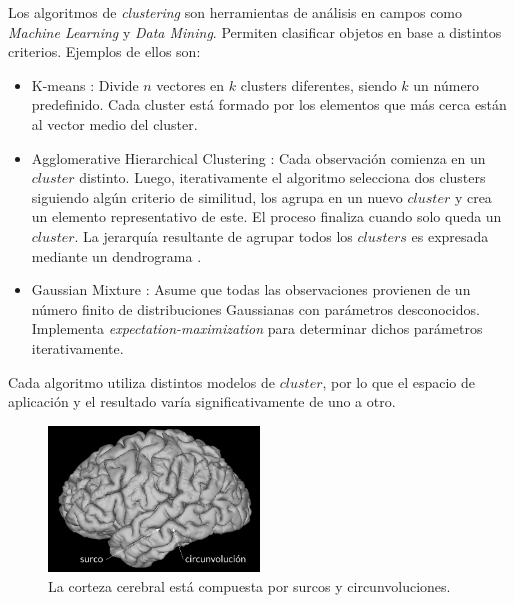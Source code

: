 Los algoritmos de \textit{clustering} son herramientas de an\'alisis en
campos como \textit{Machine Learning} y \textit{Data Mining}. Permiten
clasificar objetos en base a distintos criterios. Ejemplos de ellos son: 

\begin{itemize}
    \item K-means \cite{Hartigan1979}: Divide $n$ vectores en $k$ clusters
                   diferentes, siendo
                   $k$ un n\'umero predefinido. Cada cluster est\'a
                   formado por los elementos que m\'as cerca est\'an al
                   vector medio del cluster.
    \item Agglomerative Hierarchical Clustering \cite{Mining2009}:
                   Cada observaci\'on
                   comienza en un $cluster$ distinto. Luego, iterativamente
                   el algoritmo selecciona dos clusters siguiendo alg\'un
                   criterio de similitud, los agrupa en un nuevo $cluster$ 
                   y crea un elemento representativo de este. El proceso
                   finaliza cuando solo queda un $cluster$. La jerarqu\'ia
                   resultante de agrupar todos los $clusters$ es expresada
                   mediante un dendrograma .
    \item Gaussian Mixture \cite{Mining2009}: Asume que todas las
                   observaciones provienen de
                   un n\'umero finito de distribuciones Gaussianas con 
                   par\'ametros desconocidos. Implementa 
                   \textit{expectation-maximization} para determinar
                   dichos par\'ametros iterativamente.
\end{itemize}

Cada algoritmo utiliza distintos modelos de $cluster$, por lo que el
espacio de aplicaci\'on y el resultado var\'ia significativamente de uno a
otro. \\

\begin{figure}
    \centering
    \includegraphics[width=0.5\textwidth]{img/cerebro.png}
    \caption{La corteza cerebral est\'a compuesta por surcos y
             circunvoluciones.}
    \label{fig:cerebro}
\end{figure}

